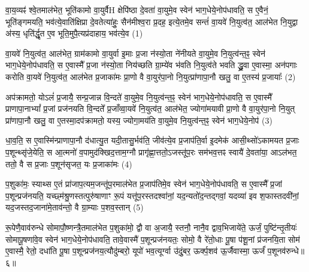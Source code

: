 \setcounter{anuvakam}{0}
वा॒य॒व्यꣴ॑ श्वे॒तमाल॑भेत॒ भूति॑कामो वा॒युर्वैH क्षेपि॑ष्ठा दे॒वता॑ वा॒युमे॒व स्वेन॑ भाग॒धेये॒नोप॑धावति॒ स ए॒वैनं॒ भूति॑ङ्गमयति॒ भव॑त्ये॒वाति॑क्षिप्रा दे॒वतेत्या॑हुः॒ सैन॑मीश्व॒रा प्र॒दह॒ इत्ये॒तमे॒व सन्तं॑ वा॒यवे॑ नि॒युत्व॑त॒ आल॑भेत नि॒युद्वा अ॑स्य॒ धृति॑र्द्धृ॒त ए॒व भूति॒मुपै॒त्यप्र॑दाहाय॒ भव॑त्ये॒व (1)

वा॒यवे॑ नि॒युत्व॑त॒ आल॑भेत॒ ग्राम॑कामो वा॒युर्वा इ॒माः प्र॒जा न॑स्यो॒ता ने॑नीयते वा॒युमे॒व नि॒युत्व॑न्त॒ꣴ॒ स्वेन॑ भाग॒धेये॒नोप॑धावति॒ स ए॒वास्मै᳚ प्र॒जा न॑स्यो॒ता निय॑च्छति ग्रा॒म्ये॑व भ॑वति नि॒युत्व॑ते भवति द्ध्रु॒वा ए॒वास्मा॒ अन॑पगाः करोति वा॒यवे॑ नि॒युत्व॑त॒ आल॑भेत प्र॒जाका॑मः प्रा॒णो वै वा॒युर॑पा॒नो नि॒युत्प्रा॑णापा॒नौ खलु॒ वा ए॒तस्य॑ प्र॒जायाः᳚ (2)

अप॑क्रामतो॒ यो\-ऽलं॑ प्र॒जायै॒ सन्प्र॒जान्न वि॒न्दते॑ वा॒युमे॒व नि॒युत्व॑न्त॒ꣴ॒ स्वेन॑ भाग॒धेये॒नोप॑धावति॒ स ए॒वास्मै᳚ प्राणापा॒ना\-भ्यां᳚ प्र॒जां प्रज॑नयति वि॒न्दते᳚ प्र॒जाँव्वा॒यवे॑ नि॒युत्व॑त॒ आल॑भेत॒ ज्योगा॑मयावी प्रा॒णो वै वा॒युर॑पा॒नो नि॒युत् प्रा॑णापा॒नौ खलु॒ वा ए॒तस्मा॒दप॑क्रामतो॒ यस्य॒ ज्योगा॒मय॑ति वा॒युमे॒व नि॒युत्व॑न्त॒ꣴ॒ स्वेन॑ भाग॒धेये॒नोप॑ (3)

धा॒व॒ति॒ स ए॒वास्मि॑न्प्राणापा॒नौ द॑धात्यु॒त यदी॒तासु॒र्भव॑ति॒ जीव॑त्ये॒व प्र॒जाप॑ति॒र्वा इ॒दमेक॑ आसी॒थ्सो॑\-ऽकामयत प्र॒जाः प॒शून्थ्सृ॑जे॒येति॒ स आ॒त्मनो॑ व॒पामुद॑क्खिद॒त्ताम॒ग्नौ प्रागृ॑ह्णा॒त्ततो॒\-ऽजस्तू॑प॒रः सम॑भव॒त्तꣴ स्वायै॑ दे॒वता॑या॒ आ\-ऽल॑भत॒ ततो॒ वै स प्र॒जाः प॒शून॑सृजत॒ यः प्र॒जाका॑मः (4)

प॒शुका॑मः॒ स्याथ्स ए॒तं प्रा॑जाप॒त्यम॒जन्तू॑प॒रमाल॑भेत प्र॒जाप॑तिमे॒व स्वेन॑ भाग॒धेये॒नोप॑धावति॒ स ए॒वास्मै᳚ प्र॒जां प॒शून्प्रज॑नयति॒ यच्छ्म॑श्रु॒णस्तत्पुरु॑षाणाꣳ रू॒पं यत्तू॑प॒रस्तदश्वा॑नां॒ यद॒न्यतो॑द॒न्तद्गवां॒ यदव्या॑ इव श॒फास्तदवी॑नां॒ यद॒ज\-स्तद॒जाना॑मे॒ताव॑न्तो॒ वै ग्रा॒म्याः प॒शव॒स्तान् (5)

रू॒पेणै॒वाव॑रुन्धे सोमापौ॒ष्णन्त्रै॒तमाल॑भेत प॒शुका॑मो॒ द्वौ वा अ॒जायै॒ स्तनौ॒ नानै॒व द्वाव॒भिजाये॑ते॒ ऊर्जं॒ पुष्टि॑न्तृ॒तीयः॑ सोमापू॒षणा॑वे॒व स्वेन॑ भाग॒धेये॒नोप॑धावति॒ तावे॒वास्मै॑ प॒शून्प्रज॑नयतः॒ सोमो॒ वै रे॑तो॒धाः पू॒षा प॑शू॒नां प्र॑जनयि॒ता सोम॑ ए॒वास्मै॒ रेतो॒ दधा॑ति पू॒षा प॒शून्प्रज॑नय॒त्यौदु॑म्बरो॒ यूपो॑ भव॒त्यूर्ग्वा उ॑दुं॒बर॒ ऊर्क्प॒शव॑ ऊ॒र्जैवास्मा॒ ऊर्जं॑ प॒शूनव॑रुन्धे॥६॥

{\anuvakamend{भव॑त्ये॒व प्र॒जाया॑ आ॒मय॑ति वा॒युमे॒व नि॒युत्व॑न्त॒ꣴ॒ स्वेन॑ भाग॒धेये॒नोप॑ प्र॒जाका॑म॒स्तान् यूप॒स्त्रयो॑दश च।]}}

